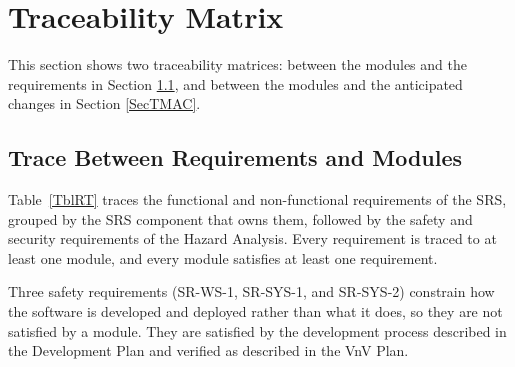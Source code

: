 \documentclass[12pt, titlepage]{article}
\begin{document}
\section{Traceability Matrix} \label{SecTM}

This section shows two traceability matrices: between the modules and the requirements in Section \ref{SecTMReq}, and between the modules and the anticipated changes in Section \ref{SecTMAC}.

\subsection{Trace Between Requirements and Modules} \label{SecTMReq}

Table~\ref{TblRT} traces the functional and non-functional requirements of the SRS, grouped by the SRS component that owns them, followed by the safety and security requirements of the Hazard Analysis. Every requirement is traced to at least one module, and every module satisfies at least one requirement.

Three safety requirements (SR-WS-1, SR-SYS-1, and SR-SYS-2) constrain how the software is developed and deployed rather than what it does, so they are not satisfied by a module. They are satisfied by the development process described in the Development Plan and verified as described in the VnV Plan.
\end{document}

